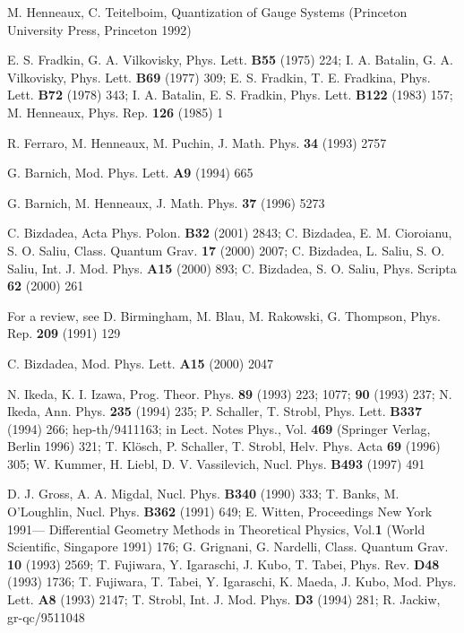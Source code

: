 \documentclass[a4paper,12pt]{article}
\begin{document}
\begin{thebibliography}{99}
  M. Henneaux, C. Teitelboim, Quantization of Gauge Systems
(Princeton University Press, Princeton 1992)

  E. S. Fradkin, G. A. Vilkovisky, Phys. Lett. \textbf{B55}
(1975) 224; I. A. Batalin, G. A. Vilkovisky, Phys. Lett. \textbf{B69} (1977)
309; E. S. Fradkin, T. E. Fradkina, Phys. Lett. \textbf{B72} (1978) 343; I.
A. Batalin, E. S. Fradkin, Phys. Lett. \textbf{B122} (1983) 157; M.
Henneaux, Phys. Rep. \textbf{126} (1985) 1

  R. Ferraro, M. Henneaux, M. Puchin, J. Math. Phys. \textbf{34}
(1993) 2757

  G. Barnich, Mod. Phys. Lett. \textbf{A9} (1994) 665

  G. Barnich, M. Henneaux, J. Math. Phys. \textbf{37} (1996) 5273

  C. Bizdadea, Acta Phys. Polon. \textbf{B32} (2001) 2843;
C. Bizdadea, E. M. Cioroianu, S. O. Saliu, Class. Quantum Grav. 
\textbf{17} (2000) 2007; C. Bizdadea, L. Saliu, S. O. Saliu, 
Int. J. Mod. Phys. \textbf{A15} (2000) 893; C. Bizdadea,
S. O. Saliu, Phys. Scripta \textbf{62} (2000) 261

  For a review, see D. Birmingham, M. Blau, M. Rakowski, G.
Thompson, Phys. Rep. \textbf{209} (1991) 129

  C. Bizdadea, Mod. Phys. Lett. \textbf{A15} (2000) 2047

  N. Ikeda, K. I. Izawa, Prog. Theor. Phys. \textbf{89} (1993)
223; 1077; \textbf{90} (1993) 237; N. Ikeda, Ann. Phys. \textbf{235} (1994)
235; P. Schaller, T. Strobl, Phys. Lett. \textbf{B337} (1994) 266;
hep-th/9411163; in Lect. Notes Phys., Vol. \textbf{469} (Springer Verlag,
Berlin 1996) 321; T. Kl\"{o}sch, P. Schaller, T. Strobl, Helv. Phys. Acta 
\textbf{69} (1996) 305; W. Kummer, H. Liebl, D. V. Vassilevich, Nucl. Phys. 
\textbf{B493} (1997) 491

  D. J. Gross, A. A. Migdal, Nucl. Phys. \textbf{B340} (1990)
333; T. Banks, M. O'Loughlin, Nucl. Phys. \textbf{B362} (1991) 649; E.
Witten, Proceedings New York 1991--- Differential Geometry Methods in
Theoretical Physics, Vol.\textbf{1} (World Scientific, Singapore 1991) 176;
G. Grignani, G. Nardelli, Class. Quantum Grav. \textbf{10} (1993) 2569; T.
Fujiwara, Y. Igaraschi, J. Kubo, T. Tabei, Phys. Rev. \textbf{D48} (1993)
1736; T. Fujiwara, T. Tabei, Y. Igaraschi, K. Maeda, J. Kubo, Mod. Phys.
Lett. \textbf{A8} (1993) 2147; T. Strobl, Int. J. Mod. Phys. \textbf{D3}
(1994) 281; R. Jackiw, gr-qc/9511048


\end{thebibliography}
\end{document}
